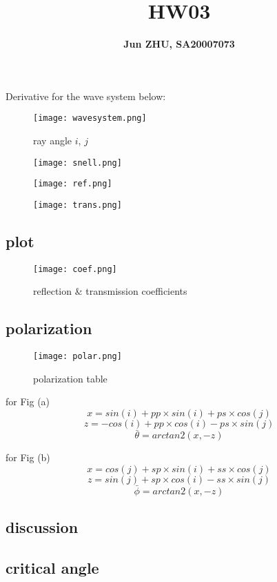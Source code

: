 \documentclass{article}
\title{\textbf{HW03}}
\author{\textbf{Jun ZHU, SA20007073}}
\begin{document}
\maketitle
\section{}
Derivative for the wave system below:
\begin{figure}[H]
\centering
\texttt{[image: wavesystem.png]}
\caption{ray angle $i$, $j$}
\end{figure}
\begin{figure}[H]
\centering
\texttt{[image: snell.png]}
\end{figure}
\begin{figure}[H]
\centering
\texttt{[image: ref.png]}
\end{figure}
\begin{figure}[H]
\centering
\texttt{[image: trans.png]}
\end{figure}
\subsection{plot}
\begin{figure}[H]
\centering
\texttt{[image: coef.png]}
\caption{reflection \& transmission coefficients}
\end{figure}
\subsection{polarization}
\begin{figure}[H]
\centering
\texttt{[image: polar.png]}
\caption{polarization table}
\end{figure}
for Fig (a)
$$x=sin(i)+pp\times sin(i)+ps\times cos(j)$$
$$z=-cos(i)+pp\times cos(i)-ps\times sin(j)$$
$$\bar{\theta} =arctan2(x, -z)$$
\par
for Fig (b)
$$x=cos(j)+sp\times sin(i)+ss\times cos(j)$$
$$z=sin(j)+sp\times cos(i)-ss\times sin(j)$$
$$\bar{\phi} =arctan2(x, -z)$$
\subsection{discussion}
\subsection{critical angle}

\section{}
\end{document}
